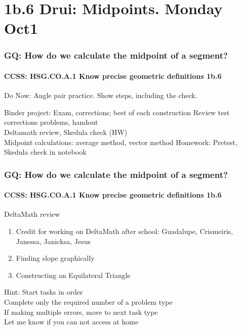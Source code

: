 \documentclass{beamer}
\begin{document}
\section{1b.6 Drui: Midpoints. Monday Oct1}
  \frame
  {
    \frametitle{GQ: How do we calculate the midpoint of a segment?}
    \framesubtitle{CCSS: HSG.CO.A.1 Know precise geometric definitions  \alert{1b.6}}

    \begin{block}{Do Now: Angle pair practice. Show steps, including the check.}
    \end{block}
    Binder project: Exam, corrections; best of each construction
    Review test corrections problems, handout\\
    Deltamath review, Skedula check (HW)\\
    Midpoint calculations: average method, vector method
    \vspace{0.5cm}
    Homework: Pretest, Skedula check in notebook
  }

  \frame
    {
      \frametitle{GQ: How do we calculate the midpoint of a segment?}
      \framesubtitle{CCSS: HSG.CO.A.1 Know precise geometric definitions  \alert{1b.6}}

      \begin{block}{DeltaMath review}
        \begin{enumerate}
            \item Credit for working on DeltaMath after school: Guadalupe, Crismeiris, Janessa, Janicksa, Jesus
            \item Finding slope graphically
            \item Constructing an Equilateral Triangle
        \end{enumerate}
      \end{block}
      Hint: Start tasks in order\\
      Complete only the required number of a problem type\\
      If making multiple errors, move to next task type\\
      \vspace{0.5cm}
      Let me know if you can not access at home
    }
\end{document}
